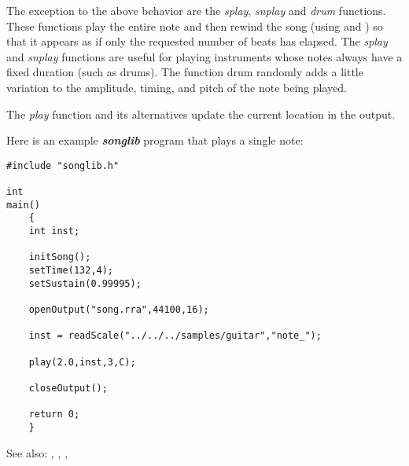 \documentclass{article}
\begin{document}
The exception to the above behavior are the
{\it splay}, {\it snplay} and {\it drum} functions.
These functions play the entire note and then
rewind the song (using 
 and 
)
so that it appears as if only the requested number of
beats has elapsed. The {\it splay} and {\it snplay} functions
are useful for playing instruments whose notes
always have a fixed duration (such as drums).
The function drum randomly adds a little variation
to the amplitude, timing, and pitch of the
note being played.

The {\it play} function and its alternatives
update the current location
in the output.

Here is an example {\it\bf songlib} program that plays a single note:

\htmlrule

\begin{verbatim}
#include "songlib.h"

int
main()
    {
    int inst;

    initSong();
    setTime(132,4);
    setSustain(0.99995);

    openOutput("song.rra",44100,16);

    inst = readScale("../../../samples/guitar","note_");

    play(2.0,inst,3,C);

    closeOutput();

    return 0;
    }
\end{verbatim}

\htmlrule
    
See also:
,
,
,
\end{document}
